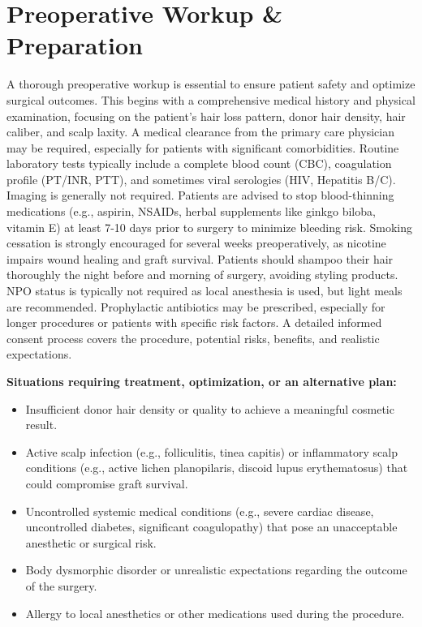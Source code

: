 \section*{Preoperative Workup \& Preparation}
A thorough preoperative workup is essential to ensure patient safety and optimize surgical outcomes. This begins with a comprehensive medical history and physical examination, focusing on the patient's hair loss pattern, donor hair density, hair caliber, and scalp laxity. A medical clearance from the primary care physician may be required, especially for patients with significant comorbidities. Routine laboratory tests typically include a complete blood count (CBC), coagulation profile (PT/INR, PTT), and sometimes viral serologies (HIV, Hepatitis B/C). Imaging is generally not required. Patients are advised to stop blood-thinning medications (e.g., aspirin, NSAIDs, herbal supplements like ginkgo biloba, vitamin E) at least 7-10 days prior to surgery to minimize bleeding risk. Smoking cessation is strongly encouraged for several weeks preoperatively, as nicotine impairs wound healing and graft survival. Patients should shampoo their hair thoroughly the night before and morning of surgery, avoiding styling products. NPO status is typically not required as local anesthesia is used, but light meals are recommended. Prophylactic antibiotics may be prescribed, especially for longer procedures or patients with specific risk factors. A detailed informed consent process covers the procedure, potential risks, benefits, and realistic expectations.

\textbf{Situations requiring treatment, optimization, or an alternative plan:}
\begin{itemize}
  \item Insufficient donor hair density or quality to achieve a meaningful cosmetic result.
  \item Active scalp infection (e.g., folliculitis, tinea capitis) or inflammatory scalp conditions (e.g., active lichen planopilaris, discoid lupus erythematosus) that could compromise graft survival.
  \item Uncontrolled systemic medical conditions (e.g., severe cardiac disease, uncontrolled diabetes, significant coagulopathy) that pose an unacceptable anesthetic or surgical risk.
  \item Body dysmorphic disorder or unrealistic expectations regarding the outcome of the surgery.
  \item Allergy to local anesthetics or other medications used during the procedure.
\end{itemize}

